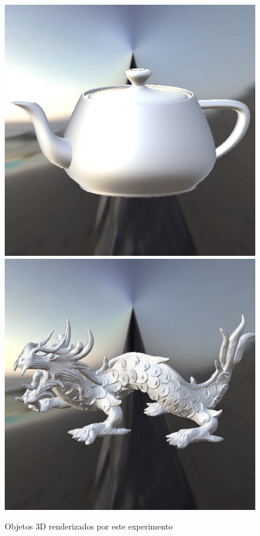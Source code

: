 \begin{figure}[H]
    \caption{\small{Objetos 3D renderizados por este experimento}}\label{fig-edwards-2006-eqlang}
  \includegraphics[width=\linewidth]{./Imagens/brdfs/edwards-2006-teapot.png}
\endminipage\hfill
{}
  \includegraphics[width=\linewidth]{./Imagens/brdfs/edwards-2006-dragon.png}

\end{figure}

